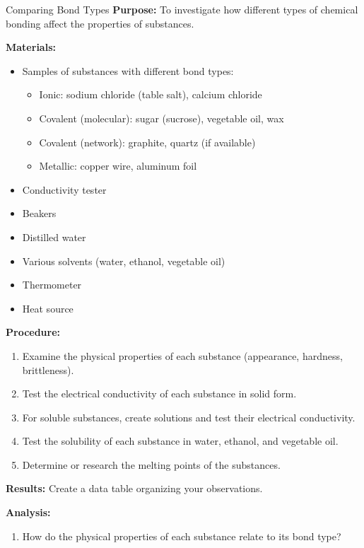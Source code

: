 \begin{investigation}{Comparing Bond Types}
\textbf{Purpose:} To investigate how different types of chemical bonding affect the properties of substances.

\textbf{Materials:}
\begin{itemize}
    \item Samples of substances with different bond types:
    \begin{itemize}
        \item Ionic: sodium chloride (table salt), calcium chloride
        \item Covalent (molecular): sugar (sucrose), vegetable oil, wax
        \item Covalent (network): graphite, quartz (if available)
        \item Metallic: copper wire, aluminum foil
    \end{itemize}
    \item Conductivity tester
    \item Beakers
    \item Distilled water
    \item Various solvents (water, ethanol, vegetable oil)
    \item Thermometer
    \item Heat source
\end{itemize}

\textbf{Procedure:}
\begin{enumerate}
    \item Examine the physical properties of each substance (appearance, hardness, brittleness).
    
    \item Test the electrical conductivity of each substance in solid form.
    
    \item For soluble substances, create solutions and test their electrical conductivity.
    
    \item Test the solubility of each substance in water, ethanol, and vegetable oil.
    
    \item Determine or research the melting points of the substances.
\end{enumerate}

\textbf{Results:}
Create a data table organizing your observations.

\textbf{Analysis:}
\begin{enumerate}
    \item How do the physical properties of each substance relate to its bond type?
    

\end{enumerate}
\end{investigation}
